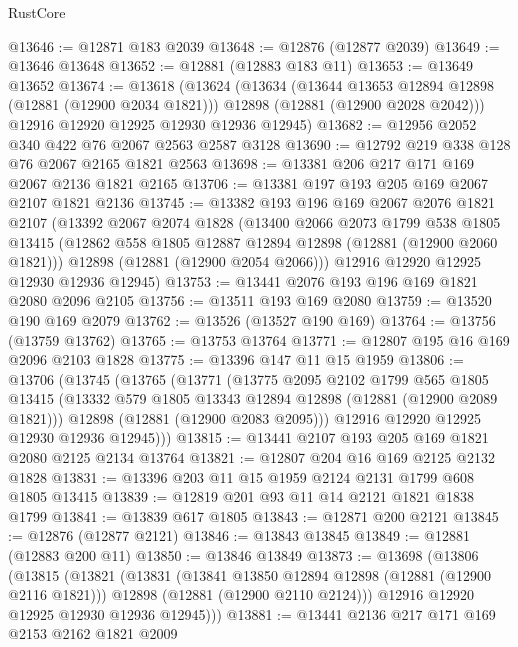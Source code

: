 \begin{lexlean}{RustCore}
\begin{coremodule}
@13646 := @12871 @183 @2039
@13648 := @12876 (@12877 @2039)
@13649 := @13646 @13648
@13652 := @12881 (@12883 @183 @11)
@13653 := @13649 @13652
@13674 := @13618
    (@13624
      (@13634
        (@13644 @13653 @12894 @12898 (@12881 (@12900 @2034 @1821)))
        @12898
        (@12881 (@12900 @2028 @2042)))
      @12916
      @12920
      @12925
      @12930
      @12936
      @12945)
@13682 := @12956 @2052 @340 @422 @76 @2067 @2563 @2587 @3128
@13690 := @12792 @219 @338 @128 @76 @2067 @2165 @1821 @2563
@13698 := @13381 @206 @217 @171 @169 @2067 @2136 @1821 @2165
@13706 := @13381 @197 @193 @205 @169 @2067 @2107 @1821 @2136
@13745 := @13382
    @193
    @196
    @169
    @2067
    @2076
    @1821
    @2107
    (@13392
      @2067
      @2074
      @1828
      (@13400
        @2066
        @2073
        @1799
        @538
        @1805
        @13415
        (@12862 @558 @1805 @12887 @12894 @12898 (@12881 (@12900 @2060 @1821)))
        @12898
        (@12881 (@12900 @2054 @2066)))
      @12916
      @12920
      @12925
      @12930
      @12936
      @12945)
@13753 := @13441 @2076 @193 @196 @169 @1821 @2080 @2096 @2105
@13756 := @13511 @193 @169 @2080
@13759 := @13520 @190 @169 @2079
@13762 := @13526 (@13527 @190 @169)
@13764 := @13756 (@13759 @13762)
@13765 := @13753 @13764
@13771 := @12807 @195 @16 @169 @2096 @2103 @1828
@13775 := @13396 @147 @11 @15 @1959
@13806 := @13706
    (@13745
      (@13765
        (@13771
          (@13775
            @2095
            @2102
            @1799
            @565
            @1805
            @13415
            (@13332 @579 @1805 @13343 @12894 @12898 (@12881 (@12900 @2089 @1821)))
            @12898
            (@12881 (@12900 @2083 @2095)))
          @12916
          @12920
          @12925
          @12930
          @12936
          @12945)))
@13815 := @13441 @2107 @193 @205 @169 @1821 @2080 @2125 @2134 @13764
@13821 := @12807 @204 @16 @169 @2125 @2132 @1828
@13831 := @13396 @203 @11 @15 @1959 @2124 @2131 @1799 @608 @1805 @13415
@13839 := @12819 @201 @93 @11 @14 @2121 @1821 @1838 @1799
@13841 := @13839 @617 @1805
@13843 := @12871 @200 @2121
@13845 := @12876 (@12877 @2121)
@13846 := @13843 @13845
@13849 := @12881 (@12883 @200 @11)
@13850 := @13846 @13849
@13873 := @13698
    (@13806
      (@13815
        (@13821
          (@13831
            (@13841 @13850 @12894 @12898 (@12881 (@12900 @2116 @1821)))
            @12898
            (@12881 (@12900 @2110 @2124)))
          @12916
          @12920
          @12925
          @12930
          @12936
          @12945)))
@13881 := @13441 @2136 @217 @171 @169 @2153 @2162 @1821 @2009

\end{coremodule}
\end{lexlean}
